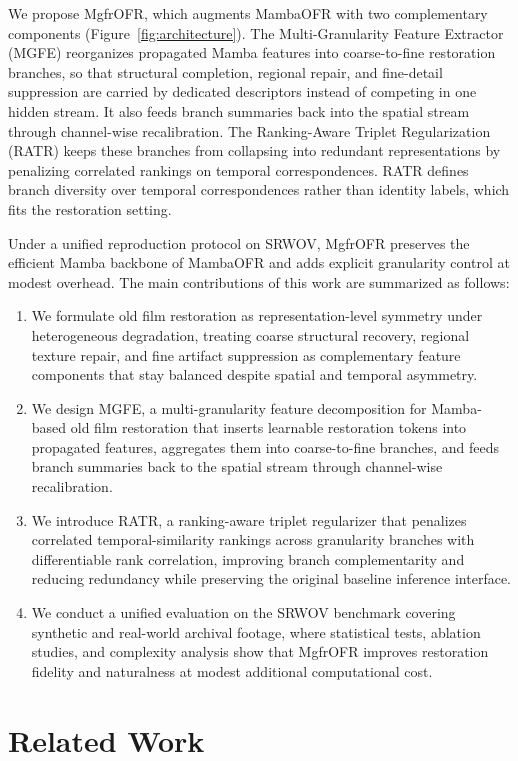 \documentclass[symmetry,article,submit,pdftex,moreauthors]{Definitions/mdpi}
\begin{document}
We propose MgfrOFR, which augments MambaOFR with two complementary components (Figure~\ref{fig:architecture}). The Multi-Granularity Feature Extractor (MGFE) reorganizes propagated Mamba features into coarse-to-fine restoration branches, so that structural completion, regional repair, and fine-detail suppression are carried by dedicated descriptors instead of competing in one hidden stream. It also feeds branch summaries back into the spatial stream through channel-wise recalibration. The Ranking-Aware Triplet Regularization (RATR) keeps these branches from collapsing into redundant representations by penalizing correlated rankings on temporal correspondences. RATR defines branch diversity over temporal correspondences rather than identity labels, which fits the restoration setting.

Under a unified reproduction protocol on SRWOV, MgfrOFR preserves the efficient Mamba backbone of MambaOFR and adds explicit granularity control at modest overhead. The main contributions of this work are summarized as follows:
\begin{enumerate}
    \item We formulate old film restoration as representation-level symmetry under heterogeneous degradation, treating coarse structural recovery, regional texture repair, and fine artifact suppression as complementary feature components that stay balanced despite spatial and temporal asymmetry.
    \item We design MGFE, a multi-granularity feature decomposition for Mamba-based old film restoration that inserts learnable restoration tokens into propagated features, aggregates them into coarse-to-fine branches, and feeds branch summaries back to the spatial stream through channel-wise recalibration.
    \item We introduce RATR, a ranking-aware triplet regularizer that penalizes correlated temporal-similarity rankings across granularity branches with differentiable rank correlation, improving branch complementarity and reducing redundancy while preserving the original baseline inference interface.
    \item We conduct a unified evaluation on the SRWOV benchmark covering synthetic and real-world archival footage, where statistical tests, ablation studies, and complexity analysis show that MgfrOFR improves restoration fidelity and naturalness at modest additional computational cost.
\end{enumerate}
\section{Related Work}
\label{sec:related}
\end{document}
